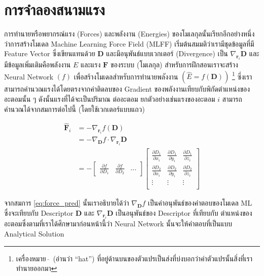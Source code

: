 \section{การจำลองสนามแรง}
\label{sec:model_ff}

การทำนายหรือพยากรณ์แรง (Forces) และพลังงาน (Energies) ของโมเลกุลนั้นเรียกอีกอย่างหนึ่งว่าการสร้างโมเดล Machine Learning 
Force Field (MLFF) เริ่มต้นสมมติว่าเรามีชุดข้อมูลที่มี Feature Vector ซึ่งเขียนแทนด้วย $\bm{D}$ และมีอนุพันธ์แบบเวกเตอร์ 
(Divergence) เป็น $\nabla_{\bm{r}_{i}} \bm{D}$ และมีข้อมูลเพิ่มเติมคือพลังงาน $E$ และแรง $\bm{F}$ ของระบบ 
(โมเลกุล) สำหรับการฝึกสอนเราจะสร้าง Neural Network $(f)$ เพื่อสร้างโมเดลสำหรับการทำนายพลังงาน $(\hat{E} = f(\bm{D}))$%
\footnote{เครื่องหมาย\, $\hat{}$\, (อ่านว่า \enquote{hat}) ที่อยู่ด้านบนของตัวแปรเป็นส่งที่บ่งบอกว่าค่าตัวแปรนั้นสิ่งที่เราทำนายออกมา} 
ซึ่งเราสามารถคำนวณแรงได้โดยตรงจากค่าติดลบของ Gradient ของพลังงานเทียบกับพิกัดตำแหน่งของอะตอมนั้น ๆ ดังนั้นแรงที่ได้จะเป็นปริมาณ%
ต่ออะตอม ยกตัวอย่างเช่นแรงของอะตอม $i$ สามารถคำนวณได้จากสมการต่อไปนี้ (โดยใช้เวกเตอร์แบบแถว)

\begin{align}\label{eq:force_pred}
    \hat{\bm{F}}_i &= - \nabla_{\bm{r}_{i}} f(\bm{D}) \\
    &= - \nabla_{\bm{D}} f \cdot \nabla_{\bm{r}_{i}} \bm{D}\\
    &= - \begin{bmatrix}
        \frac{\partial f}{\partial D_{1}} & \frac{\partial f}{\partial D_{2}} & \dots
    \end{bmatrix}
    \begin{bmatrix}
        \frac{\partial D_{1}}{\partial x_{i}} & \frac{\partial D_{1}}{\partial y_i} & 
            \frac{\partial D_{1}}{\partial z_i}\\
        \frac{\partial D_{2}}{\partial x_{i}} & \frac{\partial D_{2}}{\partial y_i} & 
            \frac{\partial D_{2}}{\partial z_i}\\
        \vdots & \vdots & \vdots \\
    \end{bmatrix}
\end{align}

\noindent จากสมการ \ref{eq:force_pred} นั้นเราอธิบายได้ว่า $\nabla_{\bm{D}} f$ เป็นค่าอนุพันธ์ของคำตอบของโมเดล ML 
ซึ่งจะเทียบกับ Descriptor $\bm{D}$ และ $\nabla_{\bm{r}_{i}} \bm{D}$ เป็นอนุพันธ์ของ Descriptor ที่เทียบกับ%
ตำแหน่งของอะตอมซึ่งตามที่เราได้ศึกษามาก่อนหน้านี้ว่า Neural Network นั้นจะให้คำตอบที่เป็นแบบ Analytical Solution

